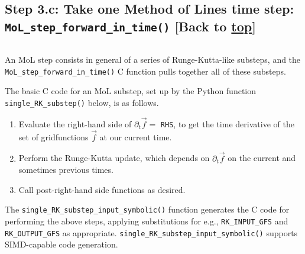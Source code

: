 \documentclass[landscape,letterpaper,10pt,english]{article}
\providecommand{\tightlist}{%
      \setlength{\itemsep}{0pt}\setlength{\parskip}{0pt}}
\begin{document}
    \hypertarget{step-3.c-take-one-method-of-lines-time-step-mol_step_forward_in_time-back-to-top}{%
\subsection{\texorpdfstring{Step 3.c: Take one Method of Lines time
step: \texttt{MoL\_step\_forward\_in\_time()} {[}Back to
\hyperref[toc]{top}{]}}{Step 3.c: Take one Method of Lines time step: MoL\_step\_forward\_in\_time() {[}Back to {]}}}\label{step-3.c-take-one-method-of-lines-time-step-mol_step_forward_in_time-back-to-top}}

\[\label{molstep}\]

An MoL step consists in general of a series of Runge-Kutta-like
substeps, and the \texttt{MoL\_step\_forward\_in\_time()} C function
pulls together all of these substeps.

The basic C code for an MoL substep, set up by the Python function
\texttt{single\_RK\_substep()} below, is as follows.

\begin{enumerate}
\def\labelenumi{\arabic{enumi}.}
\tightlist
\item
  Evaluate the right-hand side of \(\partial_t \vec{f}=\) \texttt{RHS},
  to get the time derivative of the set of gridfunctions \(\vec{f}\) at
  our current time.
\item
  Perform the Runge-Kutta update, which depends on
  \(\partial_t \vec{f}\) on the current and sometimes previous times.
\item
  Call post-right-hand side functions as desired.
\end{enumerate}

The \texttt{single\_RK\_substep\_input\_symbolic()} function generates
the C code for performing the above steps, applying substitutions for
e.g., \texttt{RK\_INPUT\_GFS} and \texttt{RK\_OUTPUT\_GFS} as
appropriate. \texttt{single\_RK\_substep\_input\_symbolic()} supports
SIMD-capable code generation.
\end{document}
